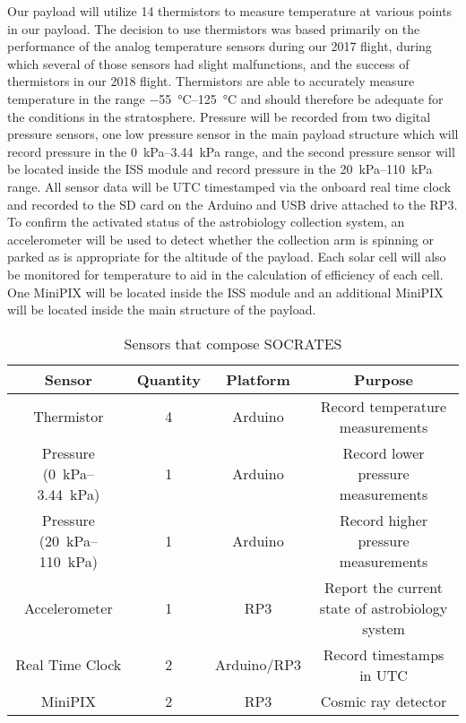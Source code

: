 Our payload will utilize 14 thermistors to measure temperature at various points in our payload. The decision to use thermistors was based primarily on the performance of the analog temperature sensors during our 2017 flight, during which several of those sensors had slight malfunctions, and the success of thermistors in our 2018 flight. Thermistors are able to accurately measure temperature in the range \SIrange{-55}{125}{\celsius} and should therefore be adequate for the conditions in the stratosphere. Pressure will be recorded from two digital pressure sensors, one low pressure sensor in the main payload structure which will record pressure in the \SIrange{0}{3.44}{\kilo\pascal} range, and the second pressure sensor will be located inside the ISS module and record pressure in the \SIrange{20}{110}{\kilo\pascal} range. All sensor data will be UTC timestamped via the onboard real time clock and recorded to the SD card on the Arduino and USB drive attached to the RP3. To confirm the activated status of the astrobiology collection system, an accelerometer will be used to detect whether the collection arm is spinning or parked as is appropriate for the altitude of the payload. Each solar cell will also be monitored for temperature to aid in the calculation of efficiency of each cell. One MiniPIX will be located inside the ISS module and an additional MiniPIX will be located inside the main structure of the payload.

\begin{table}[h!]
\centering
\caption{Sensors that compose SOCRATES}
\label{tab:Sensors}
\bigskip
\begin{tabular}{cccc}
  \hline
  \hline
  \multicolumn{1}{c}{\bfseries Sensor} & {\bfseries Quantity} & {\bfseries Platform} & {\bfseries Purpose} \\
  \hline
  Thermistor          		& 4 & Arduino  		& Record temperature measurements  \\
  Pressure (\SIrange{0}{3.44}{\kilo\pascal})        				& 1 & Arduino 		& Record lower pressure measurements \\
  Pressure (\SIrange{20}{110}{\kilo\pascal})        				& 1 & Arduino 		& Record higher pressure measurements \\
  Accelerometer       		& 1 & RP3    		& Report the current state of astrobiology system \\
  Real Time Clock 				& 2 & Arduino/RP3 	& Record timestamps in UTC \\
  MiniPIX         				& 2 & RP3     		& Cosmic ray detector \\
  \hline
  \hline
\end{tabular}
\end{table}


